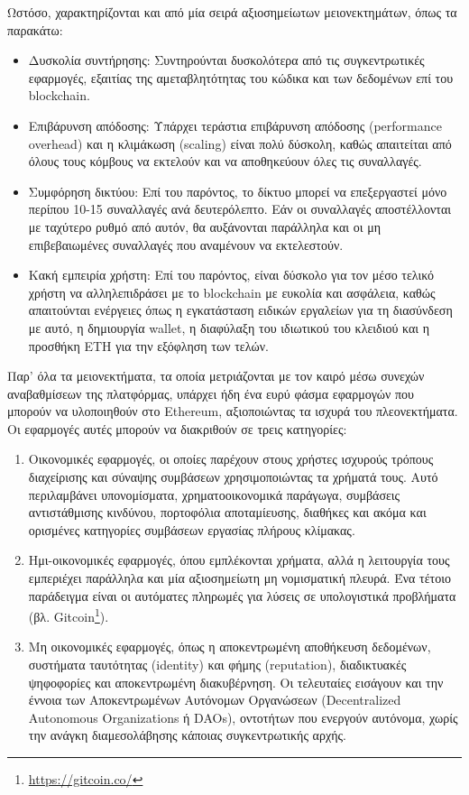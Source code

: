 Ωστόσο, χαρακτηρίζονται και από μία σειρά αξιοσημείωτων μειονεκτημάτων, όπως τα παρακάτω:
\begin{itemize}
	\item Δυσκολία συντήρησης: Συντηρούνται δυσκολότερα από τις συγκεντρωτικές εφαρμογές, εξαιτίας της αμεταβλητότητας του κώδικα και των δεδομένων επί του blockchain. 
	\item Επιβάρυνση απόδοσης: Υπάρχει τεράστια επιβάρυνση απόδοσης (performance overhead) και η κλιμάκωση (scaling) είναι πολύ δύσκολη, καθώς απαιτείται από όλους τους κόμβους να εκτελούν και να αποθηκεύουν όλες τις συναλλαγές.
	\item Συμφόρηση δικτύου: Επί του παρόντος, το δίκτυο μπορεί να επεξεργαστεί μόνο περίπου 10-15 συναλλαγές ανά δευτερόλεπτο. Εάν οι συναλλαγές αποστέλλονται με ταχύτερο ρυθμό από αυτόν, θα αυξάνονται παράλληλα και οι μη επιβεβαιωμένες συναλλαγές που αναμένουν να εκτελεστούν.
	\item Κακή εμπειρία χρήστη: Επί του παρόντος, είναι δύσκολο για τον μέσο τελικό χρήστη να αλληλεπιδράσει με το blockchain με ευκολία και ασφάλεια, καθώς απαιτούνται ενέργειες όπως η εγκατάσταση ειδικών εργαλείων για τη διασύνδεση με αυτό, η δημιουργία wallet, η διαφύλαξη του ιδιωτικού του κλειδιού και η προσθήκη ETH για την εξόφληση των τελών.
\end{itemize}

Παρ' όλα τα μειονεκτήματα, τα οποία μετριάζονται με τον καιρό μέσω συνεχών αναβαθμίσεων της πλατφόρμας, υπάρχει ήδη ένα ευρύ φάσμα εφαρμογών που μπορούν να υλοποιηθούν στο Ethereum, αξιοποιώντας τα ισχυρά του πλεονεκτήματα. Οι εφαρμογές αυτές μπορούν να διακριθούν σε τρεις κατηγορίες:
\begin{enumerate}
	\item Οικονομικές εφαρμογές, οι οποίες παρέχουν στους χρήστες ισχυρούς τρόπους διαχείρισης και σύναψης συμβάσεων χρησιμοποιώντας τα χρήματά τους. Αυτό περιλαμβάνει υπονομίσματα, χρηματοοικονομικά παράγωγα, συμβάσεις αντιστάθμισης κινδύνου, πορτοφόλια αποταμίευσης, διαθήκες και ακόμα και ορισμένες κατηγορίες συμβάσεων εργασίας πλήρους κλίμακας.
	
	\item Ημι-οικονομικές εφαρμογές, όπου εμπλέκονται χρήματα, αλλά η λειτουργία τους εμπεριέχει παράλληλα και μία αξιοσημείωτη μη νομισματική πλευρά. Ένα τέτοιο παράδειγμα είναι οι αυτόματες πληρωμές για λύσεις σε υπολογιστικά προβλήματα (βλ. Gitcoin\footnote{\url{https://gitcoin.co/}}).
	
	\item Μη οικονομικές εφαρμογές, όπως η αποκεντρωμένη αποθήκευση δεδομένων, συστήματα ταυτότητας (identity) και φήμης (reputation), διαδικτυακές ψηφοφορίες και αποκεντρωμένη διακυβέρνηση. Οι τελευταίες εισάγουν και την έννοια των Αποκεντρωμένων Αυτόνομων Οργανώσεων (Decentralized Autonomous Organizations ή DAOs), οντοτήτων που ενεργούν αυτόνομα, χωρίς την ανάγκη διαμεσολάβησης κάποιας συγκεντρωτικής αρχής.\cite{2.6-ethereum-whitepaper}
\end{enumerate}

